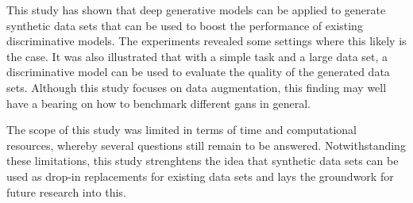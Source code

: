 This study has shown that deep generative models can be applied to generate synthetic data sets that can be used to boost the performance of existing discriminative models. The experiments revealed some settings where this likely is the case. It was also illustrated that with a simple task and a large data set, a discriminative model can be used to evaluate the quality of the generated data sets. Although this study focuses on data augmentation, this finding may well have a bearing on how to benchmark different \acrshort{gans} in general. 

The scope of this study was limited in terms of time and computational resources, whereby several questions still remain to be answered. Notwithstanding these limitations, this study strenghtens the idea that synthetic data sets can be used as drop-in replacements for existing data sets and lays the groundwork for future research into this.
